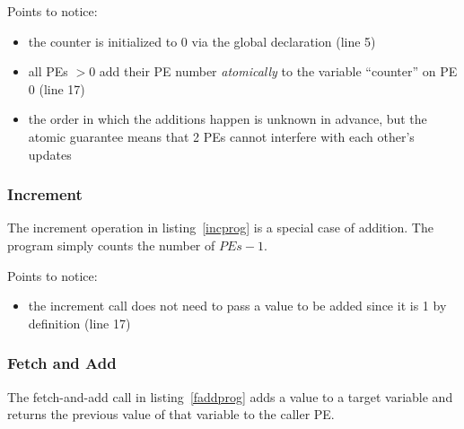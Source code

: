 Points to notice:

\begin{itemize}
\item the counter is initialized to 0 via the global declaration (line
  5)
\item all PEs $> 0$ add their PE number \emph{atomically} to the
  variable ``counter'' on PE 0 (line 17)
\item the order in which the additions happen is unknown in advance,
  but the atomic guarantee means that 2 PEs cannot interfere with each
  other's updates
\end{itemize}

\subsubsection{Increment}

The increment operation in listing~\ref{incprog} is a special case of
addition.  The program simply counts the number of $PEs - 1$.

\begin{minipage}{\linewidth}
\vspace{0.1in}
\vspace{0.1in}
\end{minipage}

Points to notice:

\begin{itemize}
\item the increment call does not need to pass a value to be added
  since it is 1 by definition (line 17)
\end{itemize}
\subsubsection{Fetch and Add}

The fetch-and-add call in listing~\ref{faddprog} adds a value to a
target variable and returns the previous value of that variable to the
caller PE.

\begin{minipage}{\linewidth}
\vspace{0.1in}
\vspace{0.1in}
\end{minipage}

